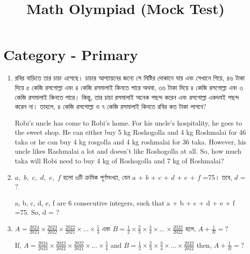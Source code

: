 \documentclass{article}
\begin{document}
	
	\title{Math Olympiad (Mock Test)}
	\author{}
	\date{}
	\maketitle
	
	\section*{Category - Primary}
	
	\begin{enumerate}[label=\textbf{\arabic*.}]
		\item 
		\begin{bengali}
			রবির বাড়িতে তার চাচা এসেছে। চাচার আপ্যায়নের জন্যে সে মিষ্টির দোকানে যায় এবং সেখানে গিয়ে, ৪৬ টাকা দিয়ে ৫ কেজি রসগোল্লা এবং ৪ কেজি রসমালাই কিনতে পারে অথবা, ৩৬ টাকা দিয়ে ৪ কেজি রসগোল্লা এবং ৩ কেজি রসমালাই কিনতে পারে। কিন্তু, তার চাচা রসমালাই অনেক পছন্দ করেন এবং রসগোল্লা একদমই পছন্দ করেন না। তাহলে, ৪ কেজি রসগোল্লা ও ৭ কেজি রসমালাই কিনতে রবির কত টাকা লাগবে?
		\end{bengali}
		
		Robi’s uncle has come to Robi’s home. For his uncle’s hospitality, he goes to the sweet shop. He can either buy 5 kg Roshogolla and 4 kg Roshmalai for 46 taka or he can buy 4 kg rosgolla and 4 kg roshmalai for 36 taka. However, his uncle likes Rashmalai a lot and doesn’t like Roshogolla at all. So, how much taka will Robi need to buy 4 kg of Roshogolla and 7 kg of Roshmalai?
		
		\item 
		\begin{bengali}
			$a,$ $b,$ $c,$ $d,$ $e,$ $f$ হলো ৬টি ক্রমিক পূর্ণসংখ্যা, যেন $a$ + $b$ + $c$ + $d$ + $e$ + $f$ =75। তবে, $d$ = ?
		\end{bengali}
		
		a, b, c, d, e, f are 6 consecutive integers, such that a + b + c + d + e + f =75. So, d = ?
		
		
		 
		  \item 
		\begin{bengali}
			 $A=\frac{2024}{2023} \times  \frac{2023}{2022} \times \frac{2022}{2021} \times \dots \times \frac{5}{4}$ এবং $B=\frac{1}{2} \times \frac{2}{3} \times \frac{3}{4} \times \dots \times \frac{2023}{2022}$ হলে, $A+ \frac{1}{B}=?$
		\end{bengali}
		
		If, $A=\frac{2024}{2023} \times \frac{2023}{2022} \times \frac{2022}{2021} \times \dots \times \frac{5}{4}$ and $B=\frac{1}{2} \times \frac{2}{3} \times \frac{3}{4} \times \dots \times \frac{2023}{2022}$ then, $A+ \frac{1}{B}=?$
	

\end{enumerate}
\end{document}
